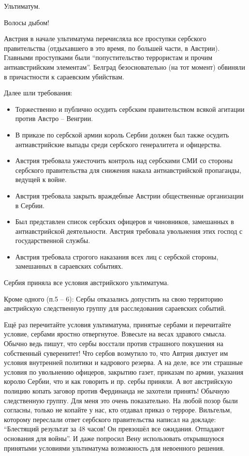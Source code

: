 Ультиматум.

\vspace{1ex}\noindent
Волосы дыбом!
\vspace{1ex}

Австрия в начале ультиматума перечисляла все проступки сербского правительства
(отдыхавшего в это время, по большей части, в Австрии). Главными проступками
были \enquote{попустительство террористам и прочим антиавстрийским элементам}.
Белград безосновательно (на тот момент) обвиняли в причастности к сараевским
убийствам.

Далее шли требования:

\begin{itemize}
\item Торжественно и публично осудить сербским правительством всякой агитации
против Австро -- Венгрии.
\item В приказе по сербской армии король Сербии должен был также осудить
антиавстрийские выпады среди сербского генералитета и офицерства.
\item Австрия требовала ужесточить контроль над сербскими СМИ со стороны
сербского правительства для снижения накала антиавстрийской пропаганды, ведущей
к войне.
\item Австрия требовала закрыть враждебные Австрии общественные организации в
Сербии.
\item Был представлен список сербских офицеров и чиновников, замешанных в
антиавстрийской деятельности. Австрия требовала увольнения этих господ с
государственной службы.
\item Австрия требовала строгого наказания всех лиц с сербской стороны,
замешанных в сараевских событиях.
\end{itemize}

Сербия приняла все условия австрийского ультиматума.

Кроме одного (п.5 -- 6): Сербы отказались допустить на свою территорию австрийскую
следственную группу для расследования сараевских событий.

Ещё раз перечитайте условия ультиматума, принятые сербами и перечитайте условие,
сербами яростно отвергнутое. Взвесьте на весах здравого смысла. Обычно ведь
пишут, что сербы восстали против страшного покушения на собственный суверенитет!
Что сербов возмутило то, что Автрия диктует им условия внутренней политики и
кадрового резерва. А на деле, все эти страшные условия по увольнению офицеров,
закрытию газет, приказам по армии, указания королю Сербии, что и как говорить и
пр. сербы приняли. А вот австрийскую полицию копать заговор против Фердинанда
не захотели принять! Обычную следственную группу. Для меня это очень
показательно. На любой позор были согласны, только не копайте у нас, кто отдавал
приказ о терроре. Вильгельм, которому переслали ответ сербского правительства
написал на докладе: \enquote{Блестящий результат за 48 часов! Он превзошёл все
ожидания. Отпадают основания для войны}. И даже попросил Вену использовать
открывшуюся принятыми условиями ультиматума возможность для невоенного решения.


